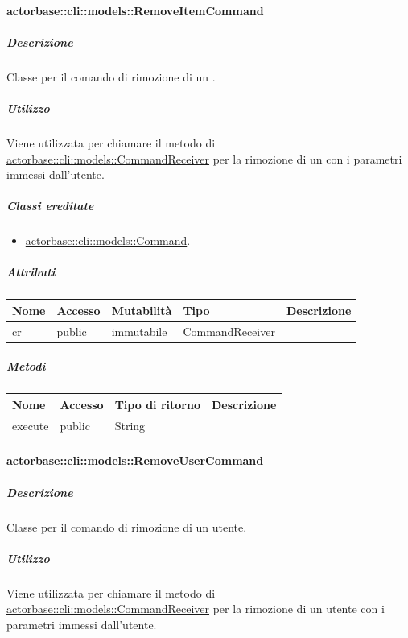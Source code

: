 \documentclass{scalatekids-article}
\begin{document}
\paragraph{actorbase::cli::models::RemoveItemCommand}
\label{sec:actorbase::cli::models::RemoveItemCommand}

\subparagraph{Descrizione}

Classe per il comando di rimozione di un .

\subparagraph{Utilizzo}

Viene utilizzata per chiamare il metodo di
\hyperref[sec:actorbase::cli::models::CommandReceiver]{actorbase::cli::models::CommandReceiver} per la rimozione di un 
con i parametri immessi dall'utente.

\subparagraph{Classi ereditate}

\begin{itemize}
\item \hyperref[sec:actorbase::cli::models::Command]{actorbase::cli::models::Command}.
\end{itemize}

\subparagraph{Attributi}

\begin{tabular}{| l | l | l | l | l |}
	\hline
	Nome & Accesso & Mutabilità & Tipo & Descrizione\\
	\hline
	cr & public & immutabile & CommandReceiver & \\
	\hline
\end{tabular}

\subparagraph{Metodi}

\begin{tabular}{| l | l | l | l |}
	\hline
	Nome & Accesso & Tipo di ritorno & Descrizione\\
	\hline
	execute & public & String & \\
	\hline
\end{tabular}

\paragraph{actorbase::cli::models::RemoveUserCommand}
\label{sec:actorbase::cli::models::RemoveUserCommand}

\subparagraph{Descrizione}

Classe per il comando di rimozione di un utente.

\subparagraph{Utilizzo}

Viene utilizzata per chiamare il metodo di
\hyperref[sec:actorbase::cli::models::CommandReceiver]{actorbase::cli::models::CommandReceiver} per la rimozione di un utente con i
parametri immessi dall'utente.
\end{document}
